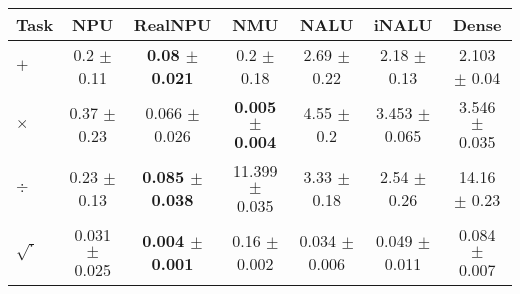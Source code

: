 \begin{tabular}{lcccccc}
\toprule
Task & NPU & RealNPU & NMU & NALU & iNALU & Dense\\
\midrule
$+$  & 0.2 $\pm$ 0.11 & \textbf{0.08 $\pm$ 0.021} & 0.2 $\pm$ 0.18 & 2.69 $\pm$ 0.22 & 2.18 $\pm$ 0.13 & 2.103 $\pm$ 0.04 \\
$\times$ & 0.37 $\pm$ 0.23 & 0.066 $\pm$ 0.026 & \textbf{0.005 $\pm$ 0.004} & 4.55 $\pm$ 0.2 & 3.453 $\pm$ 0.065 & 3.546 $\pm$ 0.035 \\
$\div$  & 0.23 $\pm$ 0.13 & \textbf{0.085 $\pm$ 0.038} & 11.399 $\pm$ 0.035 & 3.33 $\pm$ 0.18 & 2.54 $\pm$ 0.26 & 14.16 $\pm$ 0.23 \\
$\sqrt{\cdot}$ & 0.031 $\pm$ 0.025 & \textbf{0.004 $\pm$ 0.001} & 0.16 $\pm$ 0.002 & 0.034 $\pm$ 0.006 & 0.049 $\pm$ 0.011 & 0.084 $\pm$ 0.007 \\
\bottomrule
\end{tabular}

